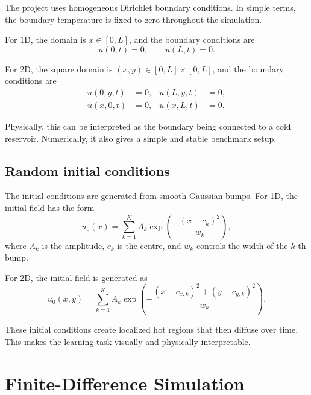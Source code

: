 \documentclass[11pt,a4paper]{article}
\begin{document}
The project uses homogeneous Dirichlet boundary conditions. In simple terms, the boundary temperature is fixed to zero throughout the simulation.

For 1D, the domain is \(x \in [0,L]\), and the boundary conditions are
\begin{equation}
    u(0,t) = 0,
    \qquad
    u(L,t) = 0.
\end{equation}

For 2D, the square domain is \((x,y) \in [0,L] \times [0,L]\), and the boundary conditions are
\begin{align}
    u(0,y,t) &= 0,
    &
    u(L,y,t) &= 0,\\
    u(x,0,t) &= 0,
    &
    u(x,L,t) &= 0.
\end{align}

Physically, this can be interpreted as the boundary being connected to a cold reservoir. Numerically, it also gives a simple and stable benchmark setup.

\subsection{Random initial conditions}

The initial conditions are generated from smooth Gaussian bumps. For 1D, the initial field has the form
\begin{equation}
    u_0(x)
    =
    \sum_{k=1}^{K}
    A_k
    \exp
    \left(
    -
    \frac{(x-c_k)^2}{w_k}
    \right),
    \label{eq:initial_1d}
\end{equation}
where \(A_k\) is the amplitude, \(c_k\) is the centre, and \(w_k\) controls the width of the \(k\)-th bump.

For 2D, the initial field is generated as
\begin{equation}
    u_0(x,y)
    =
    \sum_{k=1}^{K}
    A_k
    \exp
    \left(
    -
    \frac{(x-c_{x,k})^2 + (y-c_{y,k})^2}{w_k}
    \right).
    \label{eq:initial_2d}
\end{equation}

These initial conditions create localized hot regions that then diffuse over time. This makes the learning task visually and physically interpretable.

\section{Finite-Difference Simulation}
\end{document}
